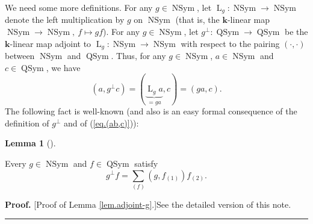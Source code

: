 \documentclass
[numbers=enddot,12pt,final,onecolumn,notitlepage,abstracton]{scrartcl}%
\theoremstyle{definition}
\newtheorem{lem}[theo]{Lemma}
\newenvironment{lemma}[1][]
{\begin{lem}[#1]\begin{leftbar}}
{\end{leftbar}\end{lem}}
\newenvironment{proof}[1][Proof]{\noindent\textbf{#1.} }{\ \rule{0.5em}{0.5em}}
\newenvironment{vershort}{}{}
\let\sumnonlimits\sum
\renewcommand{\sum}{\sumnonlimits\limits}
\begin{document}
We need some more definitions. For any $g\in\operatorname*{NSym}$, let
$\operatorname{L}_{g}:\operatorname*{NSym}\rightarrow\operatorname*{NSym}$
denote the left multiplication by $g$ on $\operatorname*{NSym}$ (that is, the
$\mathbf{k}$-linear map $\operatorname{NSym}\rightarrow\operatorname{NSym}%
,\ f\mapsto gf$). For any $g\in\operatorname{NSym}$, let $g^{\perp
}:\operatorname*{QSym}\rightarrow\operatorname*{QSym}$ be the $\mathbf{k}%
$-linear map adjoint to $\operatorname{L}_{g}:\operatorname*{NSym}%
\rightarrow\operatorname*{NSym}$ with respect to the pairing $\left(
\cdot,\cdot\right)  $ between $\operatorname*{NSym}$ and $\operatorname*{QSym}%
$. Thus, for any $g\in\operatorname*{NSym}$, $a\in\operatorname*{NSym}$ and
$c\in\operatorname*{QSym}$, we have%
\begin{equation}
\left(  a,g^{\perp}c\right)  =\left(  \underbrace{\operatorname*{L}%
\nolimits_{g}a}_{=ga},c\right)  =\left(  ga,c\right)  .
\label{pf.lem.adjoint-g.pre}%
\end{equation}
The following fact is well-known (and also is an easy formal consequence of
the definition of $g^{\perp}$ and of (\ref{eq.(ab,c)})):

\begin{lemma}
\label{lem.adjoint-g}Every $g\in\operatorname*{NSym}$ and $f\in
\operatorname*{QSym}$ satisfy%
\begin{equation}
g^{\perp}f=\sum_{\left(  f\right)  }\left(  g,f_{\left(  1\right)  }\right)
f_{\left(  2\right)  }. \label{pf.hmDless.1}%
\end{equation}

\end{lemma}

\begin{vershort}
\begin{proof}
[Proof of Lemma \ref{lem.adjoint-g}.]See the detailed version of this note.
\end{proof}
\end{vershort}
\end{document}
